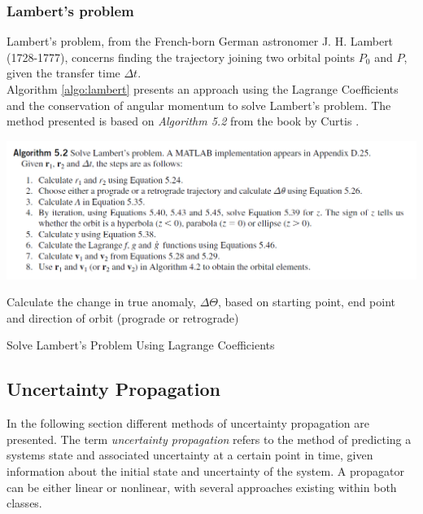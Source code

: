 \subsubsection{Lambert's problem}

Lambert's problem, from the French-born German astronomer J. H. Lambert (1728-1777), concerns finding the trajectory joining two orbital points $P_0$ and $P$, given the transfer time $\Delta t$.  \\

Algorithm \ref{algo:lambert} presents an approach using the Lagrange Coefficients and the conservation of angular momentum to solve Lambert's problem. The method presented is based on \textit{Algorithm 5.2} from the book by Curtis \cite{Curtis2009}.

\includegraphics[width=\textwidth]{Images/Alg52.PNG}

\begin{algorithm}
    \DontPrintSemicolon
    Calculate the change in true anomaly, $\mathit{\Delta\Theta}$, based on starting point, end point and direction of orbit (prograde or retrograde)\;
    \;
    \caption{Solve Lambert's Problem Using Lagrange Coefficients}
    \label{algo:lambert}
\end{algorithm}





\subsection{Uncertainty Propagation}

In the following section different methods of uncertainty propagation are presented. The term \textit{uncertainty propagation} refers to the method of predicting a systems state and associated uncertainty at a certain point in time, given information about the initial state and uncertainty of the system. A propagator can be either linear or nonlinear, with several approaches existing within both classes. \\


